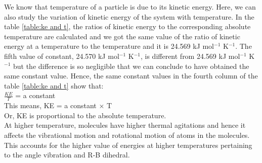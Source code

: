   We know that temperature of a particle is due to its kinetic energy. Here, we can also study the variation of kinetic energy of the system with temperature. In the table \ref{table:ke and t}, the ratios of kinetic energy to the corresponding absolute temperature are calculated and we got the same value of the ratio of kinetic energy at a temperature to the temperature and it is 24.569 kJ mol$^{-1}$ K$^{-1}$. The fifth value of constant, 24.570 kJ mol$^{-1}$ K$^{-1}$, is different from 24.569 kJ mol$^{-1}$ K$^{-1}$ but the difference is so negligible that we can conclude to have obtained the same constant value. Hence, the same constant values in the fourth column of the table \ref{table:ke and t} show that:\\
  
  $\frac{KE}{T}$ = a constant\\
  
  This means, KE  = a constant $\times$ T\\
   Or, KE is proportional to the absolute temperature.\\ 
   
   At higher temperature, molecules have higher thermal agitations and hence it affects the vibrational motion and rotational motion of atoms in the molecules. This accounts for the higher value of energies at higher temperatures  pertaining to the angle vibration and R-B dihedral.
  
 \begin{table}[H]
 \centering
 \caption[Relationship between Kinetic energy and temperature]{Relationship between Kinetic energy and temperature for butane-water system for NPT simulation}
 \label{table:ke and t}
 \end{table}
 
